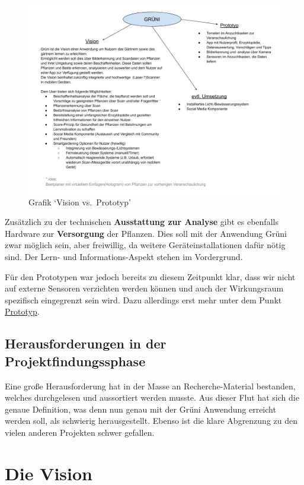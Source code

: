\begin{figure}
\centering
\includegraphics{img/Projektthema.jpg}
\caption{Grafik `Vision vs.~Prototyp'}
\end{figure}

Zusätzlich zu der technischen \textbf{Ausstattung zur Analyse} gibt es
ebenfalls Hardware zur \textbf{Versorgung} der Pflanzen. Dies soll mit
der Anwendung Grüni zwar möglich sein, aber freiwillig, da weitere
Geräteinstallationen dafür nötig sind. Der Lern- und Informations-Aspekt
stehen im Vordergrund.

Für den Prototypen war jedoch bereits zu diesem Zeitpunkt klar, dass wir
nicht auf externe Sensoren verzichten werden können und auch der
Wirkungsraum spezifisch eingegrenzt sein wird. Dazu allerdings erst mehr
unter dem Punkt \protect\hyperlink{prototyp}{Prototyp}.

\hypertarget{herausforderungen-in-der-projektfindungssphase}{%
\subsection{Herausforderungen in der
Projektfindungssphase}\label{herausforderungen-in-der-projektfindungssphase}}

Eine große Herausforderung hat in der Masse an Recherche-Material
bestanden, welches durchgelesen und aussortiert werden musste. Aus
dieser Flut hat sich die genaue Definition, was denn nun genau mit der
Grüni Anwendung erreicht werden soll, als schwierig herausgestellt.
Ebenso ist die klare Abgrenzung zu den vielen anderen Projekten schwer
gefallen.

\hypertarget{vision}{%
\section{Die Vision}\label{vision}}

